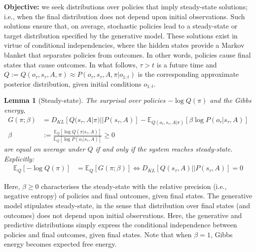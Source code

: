\documentclass{article}
\newtheorem{lemma}[theorem]{Lemma}
\begin{document}
\textbf{Objective:} we seek distributions over policies that imply steady-state solutions; i.e., when the final distribution does not depend upon initial observations. Such solutions ensure that, on average, stochastic policies lead to a steady-state or target distribution specified by the generative model. These solutions exist in virtue of conditional independencies, where the hidden states provide a Markov blanket that separates policies from outcomes. In other words, policies cause final states that cause outcomes. In what follows, $\tau >t$ is a future time and $Q:=Q(o_\tau, s_\tau, A, \pi) \approx P(o_\tau, s_\tau, A, \pi|o_{1:t})$ is the corresponding approximate posterior distribution, given initial conditions $o_{1:t}$.

\begin{lemma}[Steady-state]
\label{lemma:steady-state}
The surprisal over policies $-\log Q(\pi)$ and the Gibbs energy,
\begin{align}
    G(\pi; \beta) &= D_{KL}[Q(s_\tau, A|\pi)||P(s_\tau,A)]-\mathbb E_{Q(o_\tau, s_\tau, A|\pi)} [\beta \log P(o_\tau |s_\tau, A)] \\
    \beta &:= \frac{\mathbb E_Q[\log Q(\pi|s_\tau,A)]}{\mathbb E_Q[\log P(o_\tau|s_\tau,A)]} \geq 0
\end{align}
are equal on average under $Q$ if and only if the system reaches steady-state. Explicitly:
\begin{align}
    \mathbb E_Q[-\log Q(\pi)]&= \mathbb E_Q[G(\pi; \beta)] \iff D_{KL}[Q(s_\tau, A) ||P(s_\tau, A)]=0
\end{align}
\end{lemma}

Here, $\beta \geq 0$ characterises the steady-state with the relative precision (i.e., negative entropy) of policies and final outcomes, given final states. The generative model stipulates steady-state, in the sense that distribution over final states (and outcomes) does not depend upon initial observations. Here, the generative and predictive distributions simply express the conditional independence between policies and final outcomes, given final states. Note that when $\beta = 1$, Gibbs energy becomes expected free energy.
\end{document}
